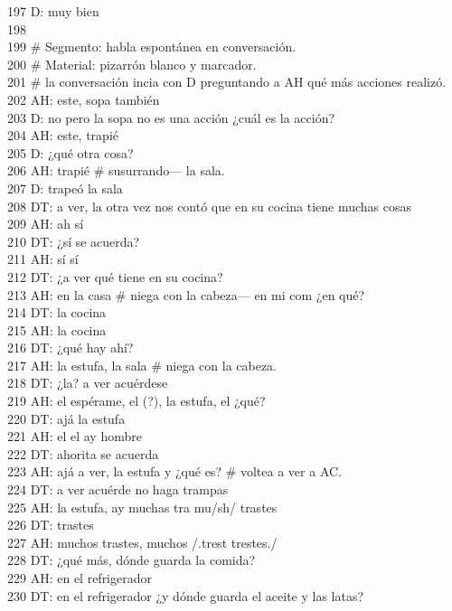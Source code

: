 197 D: muy bien\\
198 \\
199 \# Segmento: habla espontánea en conversación.\\
200 \# Material: pizarrón blanco y marcador.\\
201 \# la conversación incia con D preguntando a AH qué más acciones realizó.\\
202 AH: este, sopa también\\
203 D: no pero la sopa no es una acción ¿cuál es la acción?\\
204 AH: este, trapié\\
205 D: ¿qué otra cosa?\\
206 AH: trapié \# susurrando--- la sala.\\
207 D: trapeó la sala\\
208 DT: a ver, la otra vez nos contó que en su cocina tiene muchas cosas\\
209 AH: ah sí\\
210 DT: ¿sí se acuerda?\\
211 AH: sí sí\\
212 DT: ¿a ver qué tiene en su cocina?\\
213 AH: en la casa \# niega con la cabeza--- en mi com ¿en qué?\\
214 DT: la cocina\\
215 AH: la cocina\\
216 DT: ¿qué hay ahí?\\
217 AH: la estufa, la sala \# niega con la cabeza.\\
218 DT: ¿la? a ver acuérdese\\
219 AH: el espérame, el (?), la estufa, el ¿qué?\\
220 DT: ajá la estufa\\
221 AH: el el ay hombre\\
222 DT: ahorita se acuerda\\
223 AH: ajá a ver, la estufa y ¿qué es? \# voltea a ver a AC.\\
224 DT: a ver acuérde no haga trampas\\
225 AH: la estufa, ay muchas tra mu/sh/ trastes\\
226 DT: trastes\\
227 AH: muchos trastes, muchos /.trest trestes./\\
228 DT: ¿qué más, dónde guarda la comida?\\
229 AH: en el refrigerador\\
230 DT: en el refrigerador ¿y dónde guarda el aceite y las latas?\\
